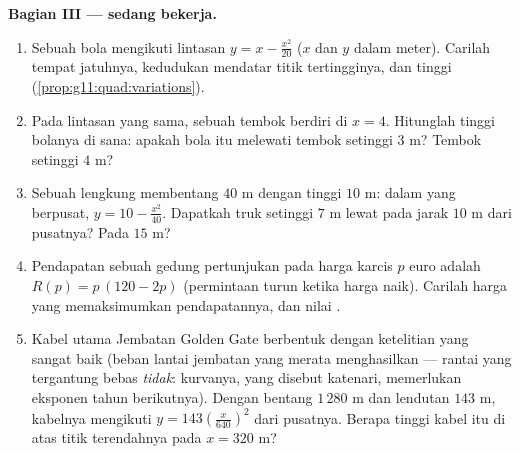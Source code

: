 \begin{problem}
\medskip
\noindent\textbf{Bagian III ---  sedang bekerja.}
\begin{enumerate}[resume]
  \item Sebuah bola mengikuti lintasan
        $y = x - \frac{x^2}{20}$ ($x$ dan $y$ dalam meter). Carilah
        tempat jatuhnya, kedudukan mendatar titik tertingginya, dan
        tinggi 
        (\cref{prop:g11:quad:variations}).
  \item Pada lintasan yang sama, sebuah tembok berdiri di $x = 4$.
        Hitunglah tinggi bolanya di sana: apakah bola itu melewati tembok
        setinggi $3$ m? Tembok setinggi $4$ m?
  \item Sebuah lengkung  membentang $40$ m dengan tinggi 
        $10$ m: dalam  yang berpusat,
        $y = 10 - \frac{x^2}{40}$. Dapatkah truk setinggi $7$ m lewat
        pada jarak $10$ m dari pusatnya? Pada $15$ m?
  \item Pendapatan sebuah gedung pertunjukan pada harga karcis $p$ euro adalah
        $R(p) = p\,(120 - 2p)$ (permintaan turun ketika harga naik).
        Carilah harga yang memaksimumkan pendapatannya, dan nilai .
  \item Kabel utama Jembatan Golden Gate berbentuk  dengan ketelitian
        yang sangat baik (beban lantai jembatan yang merata menghasilkan
         --- rantai yang tergantung bebas \emph{tidak}: kurvanya,
        yang disebut katenari, memerlukan  eksponen tahun berikutnya).
        Dengan bentang $1\,280$ m dan lendutan $143$ m, kabelnya mengikuti
        $y = 143\left(\frac{x}{640}\right)^2$ dari pusatnya.
        Berapa tinggi kabel itu di atas titik terendahnya pada
        $x = 320$ m?
\end{enumerate}


\end{problem}
